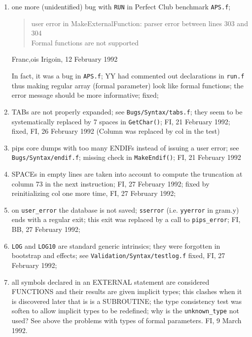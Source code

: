 \begin{enumerate}
  \item one more (unidentified) bug with \verb+RUN+ in 
	Perfect Club benchmark \verb+APS.f+; 
	\begin{quote}
	user error in MakeExternalFunction: parser error between lines 303
	and 304 \\
	Formal functions are not supported
	\end{quote}
	Franc,ois Irigoin, 12 February 1992

	In fact, it was a bug in \verb+APS.f+; 
	YY had commented out declarations in \verb+run.f+ thus making regular
	array (formal parameter) look like formal functions; the error
	message should be more informative; fixed;

  \item TABs are not properly expanded; see \verb+Bugs/Syntax/tabs.f+;
	they seem to be systematically replaced by 7 spaces 
	in \verb+GetChar()+; FI, 21 February 1992; fixed, FI, 26
	February 1992 (Column was replaced by col in the test)

  \item pips core dumps with too many ENDIFs instead of issuing a user
	error; see \verb+Bugs/Syntax/endif.f+; missing check in
	\verb+MakeEndif()+; FI, 21 February 1992

  \item SPACEs in empty lines are taken into account to compute the
	truncation at column 73 in the next instruction; FI, 27 February
	1992; fixed by reinitializing col one more time, FI, 27 February 1992;

  \item	on \verb+user_error+ the database is not saved; \verb+sserror+
	(i.e. \verb+yyerror+ in gram.y) ends with a regular exit;
	this exit was replaced by a call to \verb+pips_error+; FI, BB,
	27 February 1992;

  \item \verb+LOG+ and \verb+LOG10+ are standard generic intrinsics;
	they were forgotten in bootstrap and effects; 
	see \verb+Validation/Syntax/testlog.f+
	fixed, FI, 27 February 1992;

  \item all symbols declared in an EXTERNAL statement are considered
	FUNCTIONS and their results are given implicit types;
	this clashes when it is discovered later that is is a SUBROUTINE;
	the type consistency test was soften to allow implicit types
	to be redefined; why is the \verb+unknown_type+ not used? See
	above the problems with types of formal parameters. FI, 9 March 1992.


\end{enumerate}
